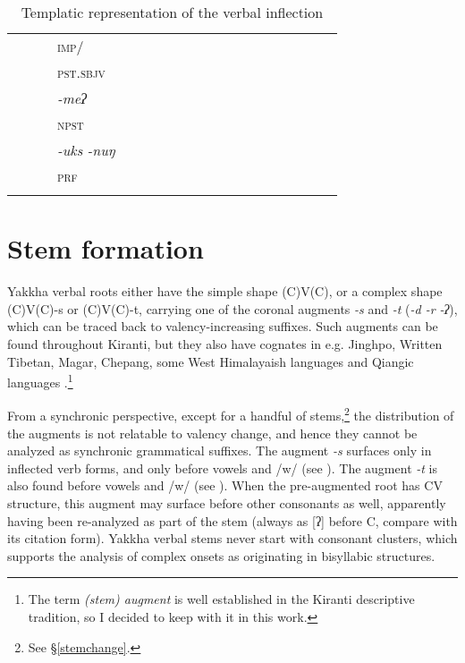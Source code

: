 \begin{landscape}
\begin{table}[p]
{\begin{tabular}{lllllllllllllllllll}
	&										&			&	\scshape imp/&				&						&						&						&						&					&				&			&				&				&			&				&					&				&				\\
	&										&			&	\scshape pst.sbjv&			&						&						&						&						&					&				&			&				&				&			&				&					&				&				\\
	&										&			&	\emph{-meʔ}&			&						&						&						&						&					&				&			&				&				&			&				&					&				&				\\
	&										&			&	\scshape npst&				&						&						&						&						&					&				&			&				&				&			&				&					&				&				\\
	&										&			&	\emph{-uks\,\ti\,-nuŋ}&	&						&						&						&						&					&				&			&				&				&			&				&					&				&				\\
	&										&			&	\scshape prf&				&						&						&						&						&					&				&			&				&				&			&				&					&				&				\\
	\lspbottomrule																																																																																		
\end{tabular}
}
\caption{Templatic representation of the verbal inflection}\label{xyz}
\end{table} 


\end{landscape}


\pagestyle{scrheadings}

\section{Stem formation}\label{stem}

Yakkha verbal roots either have the simple shape (C)V(C), or a complex shape (C)V(C)-s or (C)V(C)-t, carrying one of the coronal augments  \emph{-s} and \emph{-t} (\emph{\ti -d \ti -r \ti -ʔ}), which can be traced back to valency-increasing suffixes. Such augments can be found throughout Kiranti, but they also have cognates in e.g. Jinghpo, Written Tibetan, Magar, Chepang, some West Himalayaish languages and Qiangic languages \citep[457-59]{Matisoff2003Handbook}.\footnote{The term \emph{(stem) augment} is well established in the Kiranti descriptive tradition, so I decided to keep with it in this work.} 

From a synchronic perspective, except for a handful of stems,\footnote{See §\ref{stemchange}.} the distribution of the augments is not relatable to valency change, and hence they cannot be analyzed as synchronic grammatical suffixes. The augment \emph{-s} surfaces only in inflected verb forms, and only before vowels and /w/ (see \Next[a]). The augment \emph{-t} is also found before vowels and /w/ (see \Next[b]). When the pre-augmented root has CV structure, this augment may surface before other consonants as well, apparently having been re-analyzed as part of the  stem (always as [ʔ] before C, compare \Next[c] with its citation form). Yakkha verbal stems never start with consonant clusters, which supports the analysis of complex onsets as originating in bisyllabic structures. 


